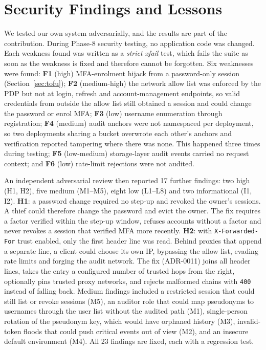 \documentclass[conference]{IEEEtran}
\newcommand{\code}[1]{\texttt{\small #1}}
\begin{document}
\section{Security Findings and Lessons}\label{sec:findings}
We tested our own system adversarially, and the results are part of the contribution. During Phase-8 security testing, no application code was changed. Each weakness found was written as a \emph{strict xfail} test, which fails the suite as soon as the weakness is fixed and therefore cannot be forgotten. Six weaknesses were found:
\textbf{F1} (high) MFA-enrolment hijack from a password-only session (Section~\ref{sec:tofu});
\textbf{F2} (medium-high) the network allow list was enforced by the PDP but not at login, refresh and account-management endpoints, so valid credentials from outside the allow list still obtained a session and could change the password or enrol MFA;
\textbf{F3} (low) username enumeration through registration;
\textbf{F4} (medium) audit anchors were not namespaced per deployment, so two deployments sharing a bucket overwrote each other's anchors and verification reported tampering where there was none. This happened three times during testing;
\textbf{F5} (low-medium) storage-layer audit events carried no request context; and
\textbf{F6} (low) rate-limit rejections were not audited.

An independent adversarial review then reported 17 further findings: two high (H1, H2), five medium (M1--M5), eight low (L1--L8) and two informational (I1, I2). \textbf{H1}: a password change required no step-up and revoked the owner's sessions. A thief could therefore change the password and evict the owner. The fix requires a factor verified within the step-up window, refuses accounts without a factor and never revokes a session that verified MFA more recently. \textbf{H2}: with \code{X-Forwarded-For} trust enabled, only the first header line was read. Behind proxies that append a separate line, a client could choose its own IP, bypassing the allow list, evading rate limits and forging the audit network. The fix (ADR-0011) joins all header lines, takes the entry a configured number of trusted hops from the right, optionally pins trusted proxy networks, and rejects malformed chains with \code{400} instead of falling back. Medium findings included a restricted session that could still list or revoke sessions (M5), an auditor role that could map pseudonyms to usernames through the user list without the audited path (M1), single-person rotation of the pseudonym key, which would have orphaned history (M3), invalid-token floods that could push critical events out of view (M2), and an insecure default environment (M4). All 23 findings are fixed, each with a regression test.
\end{document}
